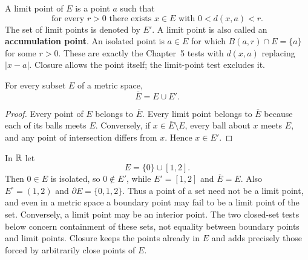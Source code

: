 \begin{definition}\label{def:metric-limits}
A limit point of $E$ is a point $a$ such that
\[
\text{for every }r>0\text{ there exists }x\in E\text{ with }0<d(x,a)<r.
\]
The set of limit points is denoted by $E'$. A limit point is also called
an \textbf{accumulation point}.
An isolated point is $a\in E$ for which $B(a,r)\cap E=\{a\}$ for some
$r>0$. These are exactly the Chapter~5 tests with $d(x,a)$ replacing
$|x-a|$. Closure allows the point itself; the limit-point test excludes it.
\end{definition}

\begin{proposition}
\label{prop:closure-limit-points}
For every subset $E$ of a metric space,
\[
\boxed{\overline E=E\cup E'.}
\]
\end{proposition}
\begin{proof}
Every point of $E$ belongs to $\overline E$. Every limit point belongs to
$\overline E$ because each of its balls meets $E$. Conversely, if
$x\in\overline E\setminus E$, every ball about $x$ meets $E$, and any
point of intersection differs from $x$. Hence $x\in E'$.
\end{proof}

\begin{example}
In $\mathbb{R}$ let
\[
E=\{0\}\cup[1,2].
\]
Then $0\in E$ is isolated, so $0\notin E'$, while $E'=[1,2]$ and
$\overline E=E$. Also $E^\circ=(1,2)$ and
$\partial E=\{0,1,2\}$. Thus a point of a set need not be a limit point,
and even in a metric space a boundary point may fail to be a limit point
of the set. Conversely, a limit point may be an interior point. The two
closed-set tests below concern containment of these sets, not equality
between boundary points and limit points. Closure keeps the points already
in $E$ and adds precisely those forced by arbitrarily close points of $E$.
\end{example}

